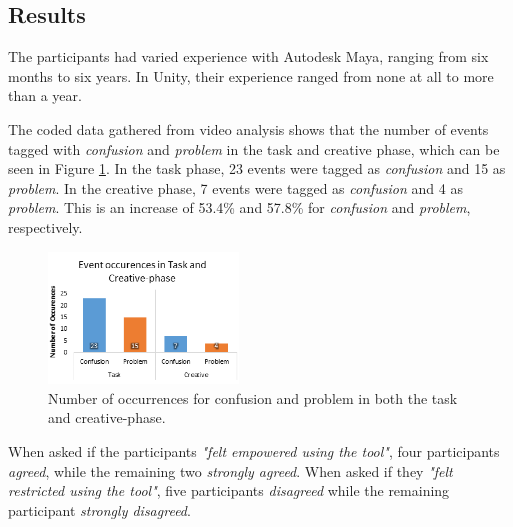 \subsection{Results} \label{results}
The participants had varied experience with Autodesk Maya, ranging from six months to six years. In Unity, their experience ranged from none at all to more than a year.



The coded data gathered from video analysis shows that the number of events tagged with \textit{confusion} and \textit{problem} in the task and creative phase, which can be seen in Figure \ref{fig:codedgraph}. In the task phase, 23 events were tagged as \textit{confusion} and 15 as \textit{problem}. In the creative phase, 7 events were tagged as \textit{confusion} and 4 as \textit{problem}. This is an increase of 53.4\% and 57.8\% for \textit{confusion} and \textit{problem}, respectively.

\begin{figure}[htbp]
\centering
\includegraphics[width=0.45\textwidth]{Pics/codedgraph2}
\caption{Number of occurrences for confusion and problem in both the task and creative-phase.}
\label{fig:codedgraph}
\end{figure}

When asked if the participants \textit{"felt empowered using the tool"}, four participants \textit{agreed}, while the remaining two \textit{strongly agreed}. When asked if they \textit{"felt restricted using the tool"}, five participants \textit{disagreed} while the remaining participant \textit{strongly disagreed}.

